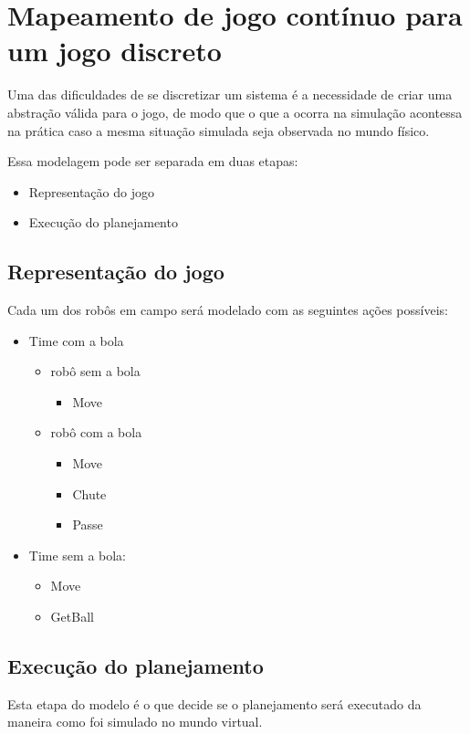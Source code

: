 \chapter{Mapeamento de jogo contínuo para um jogo discreto}

Uma das dificuldades de se discretizar um sistema é a necessidade de criar uma abstração válida para
o jogo, de modo que o que a ocorra na simulação acontessa na prática caso a mesma situação simulada
seja observada no mundo físico.

Essa modelagem pode ser separada em duas etapas:

\begin{itemize}
  \item Representação do jogo
  \item Execução do planejamento
\end{itemize}

\section{Representação do jogo}

Cada um dos robôs em campo será modelado com as seguintes ações possíveis:
\begin{itemize}
  \item Time com a bola
  \begin{itemize}
    \item robô sem a bola
    \begin{itemize}
       \item Move
    \end{itemize}
    \item robô com a bola
    \begin{itemize}
       \item Move
       \item Chute
       \item Passe
    \end{itemize}
  \end{itemize}
  \item Time sem a bola:
  \begin{itemize}
    \item Move
    \item GetBall
  \end{itemize}
\end{itemize}

\section{Execução do planejamento}

Esta etapa do modelo é o que decide se o planejamento será executado da maneira como foi simulado
no mundo virtual.
